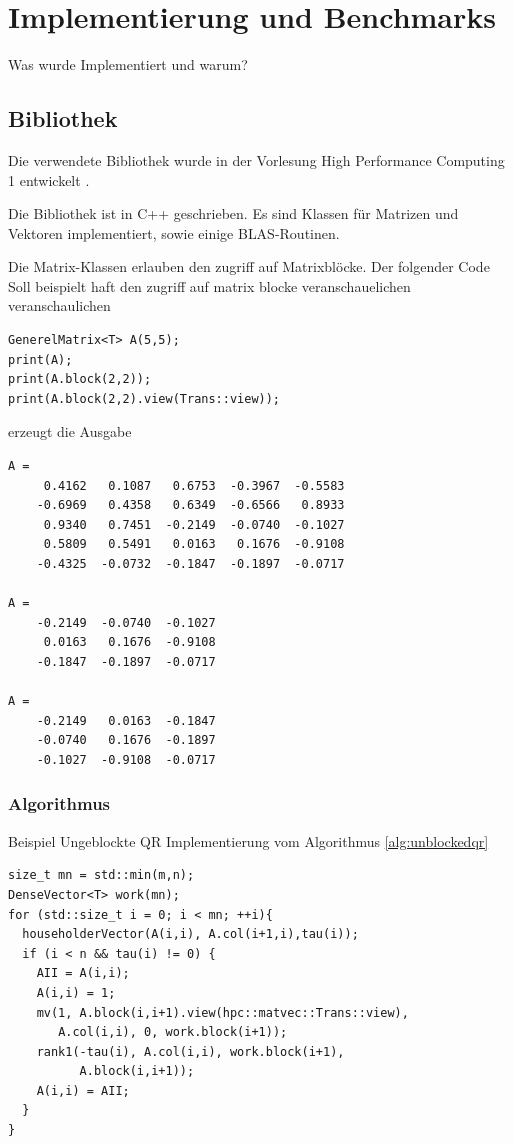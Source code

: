 \chapter{Implementierung und Benchmarks}
Was wurde Implementiert und warum?

\section{Bibliothek}
Die verwendete Bibliothek wurde in der Vorlesung High Performance Computing 1 entwickelt \cite{HPC1}.

Die Bibliothek ist in C++ geschrieben. Es sind Klassen für Matrizen und Vektoren implementiert, sowie einige BLAS-Routinen.

Die Matrix-Klassen erlauben den zugriff auf Matrixblöcke. 
Der folgender Code Soll beispielt haft den zugriff auf matrix blocke veranschauelichen veranschaulichen
\begin{lstlisting}
GenerelMatrix<T> A(5,5);
print(A);
print(A.block(2,2));
print(A.block(2,2).view(Trans::view));
\end{lstlisting}
erzeugt die Ausgabe
\lstset{numbers=none}
\begin{lstlisting} 
A = 
     0.4162   0.1087   0.6753  -0.3967  -0.5583
    -0.6969   0.4358   0.6349  -0.6566   0.8933
     0.9340   0.7451  -0.2149  -0.0740  -0.1027
     0.5809   0.5491   0.0163   0.1676  -0.9108
    -0.4325  -0.0732  -0.1847  -0.1897  -0.0717

A = 
    -0.2149  -0.0740  -0.1027
     0.0163   0.1676  -0.9108
    -0.1847  -0.1897  -0.0717

A = 
    -0.2149   0.0163  -0.1847
    -0.0740   0.1676  -0.1897
    -0.1027  -0.9108  -0.0717
\end{lstlisting}

\subsection{Algorithmus}

Beispiel Ungeblockte QR Implementierung vom Algorithmus \ref{alg:unblockedqr}
\begin{lstlisting}
size_t mn = std::min(m,n);
DenseVector<T> work(mn);
for (std::size_t i = 0; i < mn; ++i){
  householderVector(A(i,i), A.col(i+1,i),tau(i));
  if (i < n && tau(i) != 0) {
    AII = A(i,i);
    A(i,i) = 1;
    mv(1, A.block(i,i+1).view(hpc::matvec::Trans::view),
       A.col(i,i), 0, work.block(i+1));
    rank1(-tau(i), A.col(i,i), work.block(i+1), 
          A.block(i,i+1));
    A(i,i) = AII;
  }
}
\end{lstlisting}

